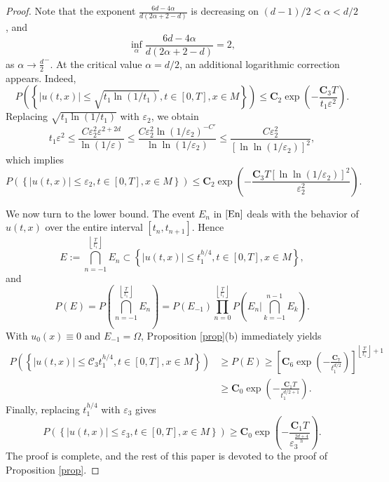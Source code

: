\documentclass[12pt]{amsart}
\numberwithin{equation}{section}
\newcommand{\1}{\mathbf{1}}
\begin{document}
\begin{proof}
Note that the exponent $\frac{6d-4\alpha}{d(2\alpha+2-d)}$ is decreasing on $(d-1)/2<\alpha< d/2$, and
\begin{equation*}
    \inf_{\alpha}\frac{6d-4\alpha}{d(2\alpha+2-d)}=2,
\end{equation*}
as $\alpha\to \frac{d}{2}^-$. At the critical value $\alpha=d/2$, an additional logarithmic correction appears. Indeed,
\begin{equation*}
    P\left(\left\lbrace\vert u(t,x)\vert\leq \sqrt{t_1\ln(1/t_1)}, t\in[0,T],x\in M\right\rbrace\right)\leq\textbf{C}_2\exp\left(-\frac{\textbf{C}_3T}{t_1\varepsilon^2}\right).
\end{equation*}
Replacing $\sqrt{t_1\ln(1/t_1)}$ with $\varepsilon_2$, we obtain
\begin{equation*}
    t_1\varepsilon^2\leq\frac{C\varepsilon_2^2\varepsilon^{2+2d}}{\ln(1/\varepsilon)}\leq\frac{C\varepsilon_2^2\ln(1/\varepsilon_2)^{-C'}}{\ln\ln(1/\varepsilon_2)}\leq\frac{C\varepsilon_2^2}{[\ln\ln(1/\varepsilon_2)]^{2}},
\end{equation*}
which implies
\begin{equation*}
    P\left(\left\lbrace\vert u(t,x)\vert\leq \varepsilon_2, t\in[0,T],x\in M\right\rbrace\right)\leq\textbf{C}_2\exp\left(-\frac{\textbf{C}_3T[\ln\ln(1/\varepsilon_2)]^2}{\varepsilon_2^{2}}\right).
\end{equation*}

We now turn to the lower bound. The event $E_{n}$ in $\eqref{En}$ deals with the behavior of $u(t,x)$ over the entire interval $[t_n,t_{n+1}]$. Hence
\[E:=\bigcap_{n=-1}^{\left\lfloor\frac{T}{t_1}\right\rfloor}E_{n}\subset \left\lbrace\vert u(t,x)\vert\leq t_1^{h/4}, t\in[0,T],x\in M\right\rbrace,\]
and
\[P(E)=P\left(\bigcap_{n=-1}^{\left\lfloor\frac{T}{t_1}\right\rfloor}E_{n}\right)=P(E_{-1})\prod_{n=0}^{\left\lfloor\frac{T}{t_1}\right\rfloor}P\left(E_{n}\bigg| \bigcap_{k=-1}^{n-1}E_{k}\right).\]
With $u_0(x)\equiv 0$ and $E_{-1}=\Omega$, Proposition \ref{prop}(b) immediately yields
\begin{equation*}
    \begin{split}
        P\left(\left\lbrace\vert u(t,x)\vert\leq \mathcal{C}_3t_1^{h/4}, t\in[0,T],x\in M\right\rbrace\right)&\geq P(E)\geq \left[\textbf{C}_6\exp\left(-\frac{\textbf{C}_7}{t_1^{d/2}}\right)\right]^{\left\lfloor\frac{T}{t_1}\right\rfloor+1}\\
        &\geq \textbf{C}_0\exp\left(-\frac{\textbf{C}_1T}{t_1^{d/2+1}}\right).
    \end{split}
\end{equation*}
Finally, replacing $t_1^{h/4}$ with $\varepsilon_3$ gives
\begin{equation*}
P\left(\left\lbrace\vert u(t,x)\vert\leq \varepsilon_3, t\in[0,T],x\in M\right\rbrace\right)\geq\textbf{C}_0\exp\left(-\frac{\textbf{C}_1T}{\varepsilon_3^{\frac{2d+4}{h}}}\right).
\end{equation*}
The proof is complete, and the rest of this paper is devoted to the proof of Proposition \ref{prop}.
\end{proof}
\end{document}
